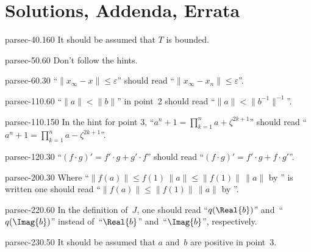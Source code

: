 \documentclass[b5page]{book}
\begin{document}
\appendix
\chapter{Solutions, Addenda, Errata}
\begin{erratum}{parsec-40.160}%
    It should be assumed that $T$ is bounded.
\end{erratum}
\begin{erratum}{parsec-50.60}%
Don't follow the hints.
\end{erratum}
\begin{erratum}{parsec-60.30}%
    ``$\|x_\infty-x\|\leq \varepsilon$'' should read  ``$\|x_\infty-x_n\|\leq\varepsilon$''.
\end{erratum}
\begin{erratum}{parsec-110.60}
``$\|a\| < \|b\|$'' in point~2
    should read ``$\|a\|<  \|b^{-1}\|^{-1}$''.
\end{erratum}
\begin{erratum}{parsec-110.150}
In the hint for point 3,
``$a^n+1 = \prod_{k=1}^n a+\zeta^{2k+1}$''
should read
``$a^n+1 = \prod_{k=1}^n a-\zeta^{2k+1}$''.
\end{erratum}
\begin{erratum}{parsec-120.30}
``$(f\cdot g)'=f'\cdot g + g'\cdot f$'' should
    read ``$(f\cdot g)' = f'\cdot g + f\cdot g'$''.
\end{erratum}
\begin{erratum}{parsec-200.30}
Where  ``$\|f(a)\|\leq f(1)\,\|a\|\leq\|f(1)\|\,\|a\|$
    by ''
is written
one should read
``$\|f(a)\|\leq\|f(1)\|\,\|a\|$ by ''.
\end{erratum}
\begin{erratum}{parsec-220.60}
In the definition of~$J$,
one should read ``$q(\Real{b})$''
and~``$q(\Imag{b})$''
instead of~``$\Real{b}$''
and~``$\Imag{b}$'', respectively.
\end{erratum}
\begin{erratum}{parsec-230.50}
It should be assumed that $a$ and~$b$ are
positive in point~3.
\end{erratum}
\end{document}
